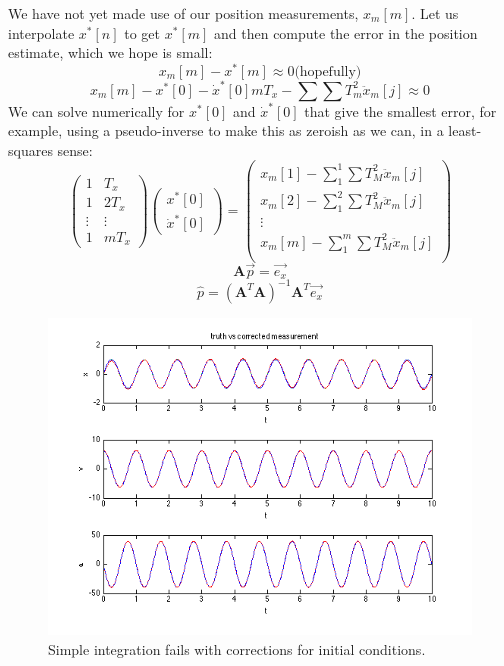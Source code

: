 \documentclass{amsart}
\begin{document}
We have not yet made use of our position measurements, $x_m[m]$. Let us interpolate $x^*[n]$ to get $x^*[m]$ and then compute the error in the position estimate, which we hope is small:
\begin{equation}
x_m[m] - x^*[m] \approx 0 \mbox{(hopefully)}
\end{equation}
\begin{equation}
x_m[m] - x^*[0] - \dot{x}^*[0] m T_x - \sum \sum T_m^2 \ddot{x}_m[j] \approx 0
\end{equation}
We can solve numerically for $x^*[0]$ and $\dot{x}^*[0]$ that give the smallest error, for example, using a pseudo-inverse to make this as zeroish as we can, in a least-squares sense:
\begin{equation}
\begin{pmatrix}
1 & T_x \\
1 & 2T_x \\
\vdots & \vdots\\
1 & mT_x
\end{pmatrix}
\begin{pmatrix}
x^*[0]\\
\dot{x}^*[0]
\end{pmatrix}
= 
\begin{pmatrix}
x_m[1]-\sum_1^1\sum T_M^2 \ddot{x}_m[j] \\
x_m[2]-\sum_1^2\sum T_M^2 \ddot{x}_m[j] \\
\vdots\\
x_m[m]-\sum_1^m\sum T_M^2 \ddot{x}_m[j] \\
\end{pmatrix}
\end{equation}
\begin{equation}
\mathbf{A} \vec{p} = \vec{e_x}
\end{equation}
\begin{equation}
\hat{p} = (\mathbf{A}^T \mathbf{A})^{-1} \mathbf{A}^T \vec{e_x}
\end{equation}

\begin{figure}
\includegraphics[width=\textwidth]{figures/foo1-corr.png}
\caption{Simple integration fails with corrections for initial conditions.}
\label{fig:corr1}
\end{figure}
\end{document}
